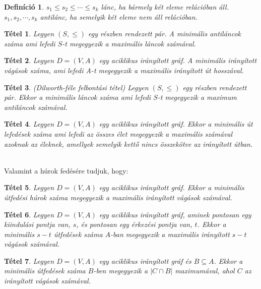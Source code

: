 \documentclass[12pt]{article}
\newtheorem{defin}{Definíció}[section]
\newtheorem{tetel}{Tétel}[section]
\begin{document}
\begin{defin}
$s_1 \leq s_2 \leq \cdots \leq s_k$ lánc, ha bármely két eleme relációban áll. $s_1,s_2, \cdots ,s_k$ antilánc, ha semelyik két eleme nem áll relációban. ~\cite{bomze1999maximum}
\end{defin}

\begin{tetel}
Legyen $(S, \leq)$ egy részben rendezett pár. A minimális antiláncok száma ami lefedi $S$-t megegyezik a maximális láncok számával. ~\cite{bomze1999maximum}
\end{tetel}

\begin{tetel}
Legyen $D = (V,A)$ egy  aciklikus irányított gráf. A minimális irányított vágások száma, ami lefedi A-t megegyezik a maximális irányított út hosszával. ~\cite{bomze1999maximum}
\end{tetel}

\begin{tetel}
(Dilworth-féle felbontási tétel) Legyen $(S, \leq)$ egy részben rendezett pár. Ekkor a minimális láncok száma ami lefedi $S$-t megegyezik a maximum antiláncok számával. ~\cite{bomze1999maximum}
\end{tetel}

\begin{tetel}
Legyen $D = (V,A)$ egy aciklikus irányított gráf. Ekkor a minimális út lefedések száma ami lefedi az összes élet megegyezik a maximális számával azoknak az éleknek, amellyek semelyik kettő nincs összekötve az irányított útban. ~\cite{bomze1999maximum}
\end{tetel}

Valamint a húrok fedésére tudjuk, hogy:

\begin{tetel}
Legyen $D = (V,A)$ egy aciklikus irányított gráf. Ekkor a minimális útfedési húrok száma megegyezik a maximális irányított vágások számával. ~\cite{bomze1999maximum}
\end{tetel}

\begin{tetel}
Legyen $D = (V,A)$ egy aciklikus irányított gráf, aminek pontosan egy kiindulási pontja van, $s$, és pontosan egy érkezési pontja van, $t$. Ekkor a minimális $s - t$ útfedések száma $A$-ban megegyezik a maximális irányított $s - t$ vágások számával. ~\cite{bomze1999maximum}
\end{tetel}

\begin{tetel}
Legyen $D = (V,A)$ egy aciklikus irányított gráf és $B \subseteq A$. Ekkor a minimális útfedések száma $B$-ben megegyezik a $|C \cap B|$ maximumával, ahol $C$ az irányított vágások számával. ~\cite{bomze1999maximum}
\end{tetel}
\end{document}
